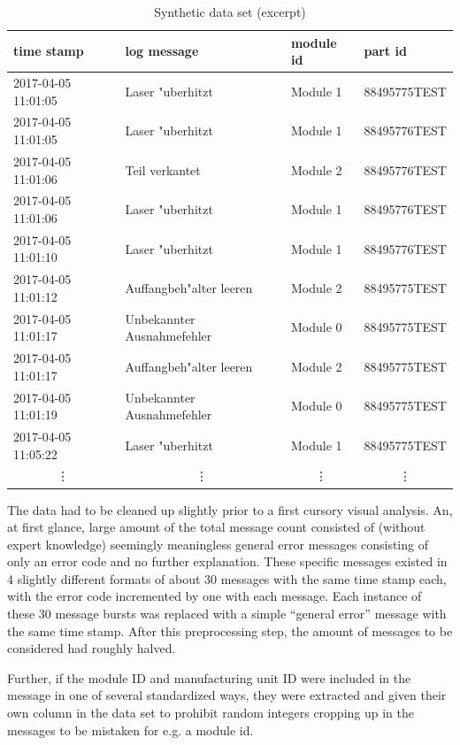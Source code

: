 \documentclass[pdftex,12pt,a4paper]{report}
\begin{document}
\begin{table}[]
	\centering
	\caption{Synthetic data set (excerpt)}
	\label{table:dummy_messages}
	\footnotesize 
	\begin{tabular}{l|l|l|l}
		time stamp & log message & module id & part id \\ \hline
		2017-04-05 11:01:05 & Laser "uberhitzt            & Module 1 & 88495775TEST \\
		2017-04-05 11:01:05 & Laser "uberhitzt            & Module 1 & 88495776TEST \\
		2017-04-05 11:01:06 & Teil verkantet             & Module 2 & 88495776TEST \\
		2017-04-05 11:01:06 & Laser "uberhitzt            & Module 1 & 88495776TEST \\
		2017-04-05 11:01:10 & Laser "uberhitzt            & Module 1 & 88495776TEST \\
		2017-04-05 11:01:12 & Auffangbeh"alter leeren     & Module 2 & 88495775TEST \\
		2017-04-05 11:01:17 & Unbekannter Ausnahmefehler & Module 0 & 88495775TEST \\
		2017-04-05 11:01:17 & Auffangbeh"alter leeren     & Module 2 & 88495775TEST \\
		2017-04-05 11:01:19 & Unbekannter Ausnahmefehler & Module 0 & 88495775TEST \\
		2017-04-05 11:05:22 & Laser "uberhitzt            & Module 1 & 88495775TEST \\
		\multicolumn{1}{c}{\vdots} & \multicolumn{1}{c}{\vdots} & \multicolumn{1}{c}{\vdots} & \multicolumn{1}{c}{\vdots}
	\end{tabular}
\end{table}

The data had to be cleaned up slightly prior to a first cursory visual analysis. An, at first glance, large amount of the total message count consisted of (without expert knowledge) seemingly meaningless general error messages consisting of only an error code and no further explanation. These specific messages existed in 4 slightly different formats of about 30 messages with the same time stamp each, with the error code incremented by one with each message. Each instance of these 30 message bursts was replaced with a simple ``general error'' message with the same time stamp. After this preprocessing step, the amount of messages to be considered had roughly halved.

Further, if the module ID and manufacturing unit ID were included in the message in one of several standardized ways, they were extracted and given their own column in the data set to prohibit random integers cropping up in the messages to be mistaken for e.g. a module id.
\end{document}
